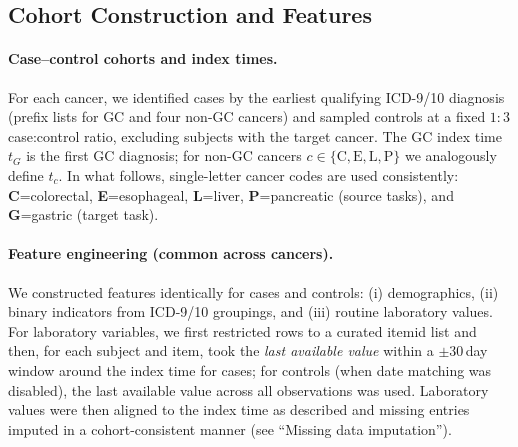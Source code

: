 \documentclass[journal,article,submit,pdftex,moreauthors]{Definitions/mdpi}
\begin{document}
\subsection{Cohort Construction and Features}

\paragraph{Case--control cohorts and index times.}
For each cancer, we identified cases by the earliest qualifying ICD-9/10 diagnosis (prefix lists for GC and four non-GC cancers) and sampled controls at a fixed $1{:}3$ case:control ratio, excluding subjects with the target cancer. The GC index time $t_G$ is the first GC diagnosis; for non-GC cancers $c\in\{\mathrm{C},\mathrm{E},\mathrm{L},\mathrm{P}\}$ we analogously define $t_c$. In what follows, single-letter cancer codes are used consistently: \textbf{C}=colorectal, \textbf{E}=esophageal, \textbf{L}=liver, \textbf{P}=pancreatic (source tasks), and \textbf{G}=gastric (target task).

\paragraph{Feature engineering (common across cancers).}
We constructed features identically for cases and controls: (i) demographics, (ii) binary indicators from ICD-9/10 groupings, and (iii) routine laboratory values. For laboratory variables, we first restricted rows to a curated itemid list and then, for each subject and item, took the \emph{last available value} within a $\pm30$\,day window around the index time for cases; for controls (when date matching was disabled), the last available value across all observations was used. Laboratory values were then aligned to the index time as described and missing entries imputed in a cohort-consistent manner (see “Missing data imputation”).
\end{document}

